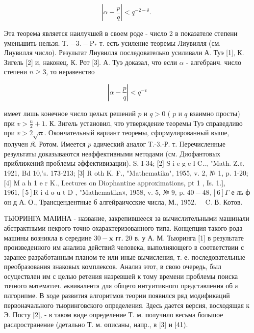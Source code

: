 \documentclass[10pt]{article}
\begin{document}
\[

\left|\alpha-\frac{p}{q}\right|<q^{-2-\delta} \text {. }

\]



Эта теорема является наилучшей в своем роде - число 2 в показателе степени уменьшить нельзя. Т. $-3 .-\mathrm{P}_{*}$ т. есть усиление теоремы Лиувилля (см. Лиувилля число). Результат Лиувилля последовательно усиливали А. Туэ [1], К. Зигель [2] и, наконец, К. Рот [3]. А. Туэ доказал, что если $\alpha$ - алгебраич. число степени $n \geqslant 3$, то неравенство



\[

\left|\alpha-\frac{p}{q}\right|<q^{-v}

\]



имеет лишь конечное число целых решений $p$ и $q>0$ ( $p$ и $q$ взаимно просты) при $v>\frac{n}{2}+1$. К. Зигель установил, что утверждение теоремы Туэ справедливо при $v>2 \sqrt{n}$. Окончательный вариант теоремы, сформулированный выше, получен $\mathfrak{K}$. Ротом. Имеется $p$ адический аналог Т.-3.-Р. т. Перечисленные результаты доказываются неәффективными методами (см. Диофантовых приближений проблемы әффективизации). S. I-34; [2] S i e g e l C.., "Math. Z.», 1921, Bd 10,'s. 173-213; [3] R oth K. F., "Mathematika", 1955, v. 2, № 1, p. 1-20; [4] M a h 1 e r K., Lectures on Diophantine approximations, pt 1 , Is. 1.], $1961,[5] \mathrm{R}$ i d o u t D , "Mathematika», 1958, v. 5, № 9, p. $40-48,[6] \Gamma$ е ль ф он д А. О., Трансцендентные б алгейраичсские числа, М., $1952 . \quad$ C. В. Котов.



ТЬЮРИНГА МАІИНА - название, закрепившееся за вычислительными машинали абстрактными некрого точно охарактеризованного типа. Концепция такого рода машины возникла в середине $30-\mathbf{x}$ гг. 20 в. у А. М. Тьюринга [1] в результате произведенного им анализа действий человека, выполняющего в соответствии с заранее разработанным планом те или иные вычисления, т. е. последовательные преобразования знаковых комплексов. Анализ этот, в свою очередь, был осуцествлен им с целью ретения назревшей к тому времени проблемы поиска точного математич. әквивалента для общего интуитивного представления об $а$ плгорипме. В ходе развития алгоритмов теории появился ряд модификаций первоначального тьюринговского определения. Здесь дается версия, восходящая к Э. Посту [2], - в таком виде определение Т. м. получило весьма большое раслространение (детально Т. м. описаны, напр., в [3] и [41).
\end{document}
